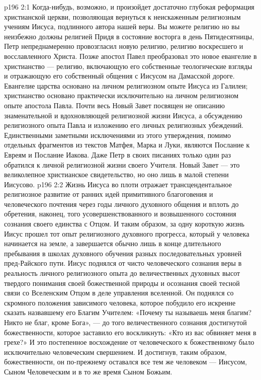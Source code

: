 \vs p196 2:1 Когда\hyp{}нибудь, возможно, и произойдет достаточно глубокая реформация христианской церкви, позволяющая вернуться к неискаженным религиозным учениям Иисуса, подлинного автора нашей веры. Вы можете  религию  но вы неизбежно должны  религией  Придя в состояние восторга в день Пятидесятницы, Петр непреднамеренно провозгласил новую религию, религию воскресшего и восславленного Христа. Позже апостол Павел преобразовал это новое евангелие в христианство --- религию, включающую его собственные теологические взгляды и отражающую его собственный  общения с Иисусом на Дамасской дороге. Евангелие царства основано на личном религиозном опыте Иисуса из Галилеи; христианство основано практически исключительно на личном религиозном опыте апостола Павла. Почти весь Новый Завет посвящен не описанию знаменательной и вдохновляющей религиозной жизни Иисуса, а обсуждению религиозного опыта Павла и изложению его личных религиозных убеждений. Единственными заметными исключениями из этого утверждения, помимо отдельных фрагментов из текстов Матфея, Марка и Луки, являются Послание к Евреям и Послание Иакова. Даже Петр в своих писаниях только один раз обратился к личной религиозной жизни своего Учителя. Новый Завет --- это великолепное христианское свидетельство, но оно лишь в малой степени Иисусово.
\vs p196 2:2 Жизнь Иисуса во плоти отражает трансцендентальное религиозное развитие от ранних идей примитивного благоговения и человеческого почтения через годы личного духовного общения и вплоть до обретения, наконец, того усовершенствованного и возвышенного состояния сознания своего единства с Отцом. И таким образом, за одну короткую жизнь Иисус прошел тот опыт религиозного духовного прогресса, который у человека начинается на земле, а завершается обычно лишь в конце длительного пребывания в школах духовного обучения разных последовательных уровней пред\hyp{}Райского пути. Иисус поднялся от чисто человеческого сознания веры в реальность личного религиозного опыта до величественных духовных высот твердого понимания своей божественной природы и осознания своей тесной связи со Вселенским Отцом в деле управления вселенной. Он поднялся со скромного положения зависимого человека, которое побудило его искренне сказать назвавшему его Благим Учителем: «Почему ты называешь меня благим? Никто не благ, кроме Бога», --- до того величественного сознания достигнутой божественности, которое заставило его воскликнуть: «Кто из вас обвиняет меня в грехе?» И это постепенное восхождение от человеческого к божественному было исключительно человеческим свершением. И достигнув, таким образом, божественности, он по\hyp{}прежнему оставался все тем же человеком --- Иисусом, Сыном Человеческим и в то же время Сыном Божьим.
